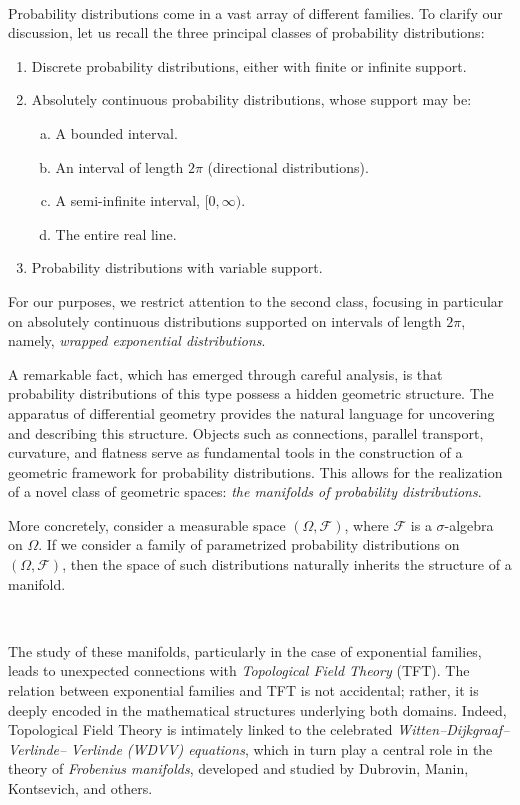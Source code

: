 \,

Probability distributions come in a vast array of different families. To clarify our discussion, let us recall the three principal classes of probability distributions:

\begin{enumerate}[1)]
    \item Discrete probability distributions, either with finite or infinite support.
    \item Absolutely continuous probability distributions, whose support may be:
    \begin{enumerate}[a)]
        \item A bounded interval.
        \item An interval of length $2\pi$ (directional distributions).
        \item A semi-infinite interval, $[0, \infty)$.
        \item The entire real line.
    \end{enumerate}
    \item Probability distributions with variable support.
\end{enumerate}

For our purposes, we restrict attention to the second class, focusing in particular on absolutely continuous distributions supported on intervals of length $2\pi$, namely, \emph{wrapped exponential distributions}. 

A remarkable fact, which has emerged through careful analysis, is that probability distributions of this type possess a hidden geometric structure. The apparatus of differential geometry provides the natural language for uncovering and describing this structure. Objects such as connections, parallel transport, curvature, and flatness serve as fundamental tools in the construction of a geometric framework for probability distributions. This allows for the realization of a novel class of geometric spaces: \emph{the manifolds of probability distributions}. 

More concretely, consider a measurable space $(\Omega, \mathcal{F})$, where $\mathcal{F}$ is a $\sigma$-algebra on $\Omega$. If we consider a family of parametrized probability distributions on $(\Omega, \mathcal{F})$, then the space of such distributions naturally inherits the structure of a manifold. 

\,

The study of these manifolds, particularly in the case of exponential families, leads to unexpected connections with \emph{Topological Field Theory} (TFT). The relation between exponential families and TFT is not accidental; rather, it is deeply encoded in the mathematical structures underlying both domains. Indeed, Topological Field Theory is intimately linked to the celebrated \emph{Witten–Dijkgraaf–Verlinde–}
\emph{Verlinde (WDVV) equations}, which in turn play a central role in the theory of \emph{Frobenius manifolds}, developed and studied by Dubrovin, Manin, Kontsevich, and others. 

